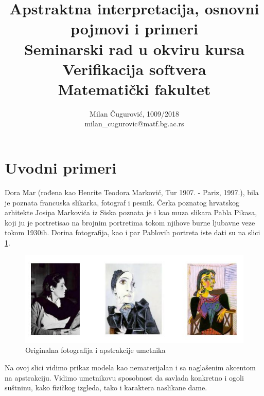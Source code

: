 \documentclass[a4paper]{article}
\begin{document}
\title{Apstraktna interpretacija, osnovni pojmovi i primeri\\ \small{Seminarski rad u okviru kursa\\Verifikacija softvera\\ Matematički fakultet}}

\author{Milan Čugurović, 1009/2018\\ milan\_cugurovic@matf.bg.ac.rs}
\maketitle


\tableofcontents

\newpage

\section{Uvodni primeri}
\label{sec:uvod}
Dora Mar (rođena kao Henrite Teodora Marković, Tur 1907. - Pariz, 1997.), bila je poznata francuska slikarka, fotograf i pesnik. Ćerka poznatog hrvatskog arhitekte Josipa Markovića iz Siska poznata je i kao muza slikara Pabla Pikasa, koji ju je portretisao na brojnim portretima tokom njihove burne ljubavne veze tokom 1930ih.\cite{dora} \newline
Dorina fotografija, kao i par Pablovih portreta iste dati su na slici  \ref{fig:doramar}.
\begin{figure}[h!]
\begin{center}
\includegraphics[scale=0.6]{doramar.JPG}
\end{center}
\caption{Originalna fotografija i apstrakcije umetnika}
\label{fig:doramar}
\end{figure} \newline 
Na ovoj slici vidimo prikaz modela kao nematerijalan i sa naglašenim akcentom na apstrakciju. Vidimo umetnikovu sposobnost da savlada konkretno i ogoli suštninu, kako fizičkog izgleda, tako i karaktera naslikane dame.\cite{pcousot3}\newline
\end{document}
